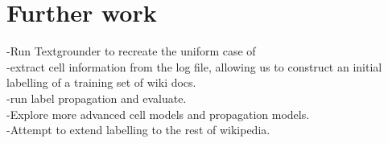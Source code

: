 \section{Further work}
-Run Textgrounder to recreate the uniform case of \cite{rolleretal:12}\\
-extract cell information from the log file, allowing us to construct an initial labelling of a training set of wiki docs.\\
-run label propagation and evaluate.\\
-Explore more advanced cell models and propagation models.\\
-Attempt to extend labelling to the rest of wikipedia.
